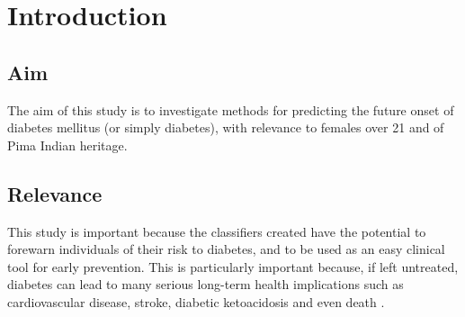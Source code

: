 \section{Introduction}


\subsection{Aim}

The aim of this study is to investigate methods for predicting the future onset of diabetes mellitus (or simply diabetes), with relevance to females over 21 and of Pima Indian heritage.

\subsection{Relevance}
This study is important because the classifiers created have the potential to forewarn individuals of their risk to diabetes, and to be used as an easy clinical tool for early prevention. This is particularly important because, if left untreated, diabetes can lead to many serious long-term health implications such as cardiovascular disease, stroke, diabetic ketoacidosis and even death \cite{diabetes}.
